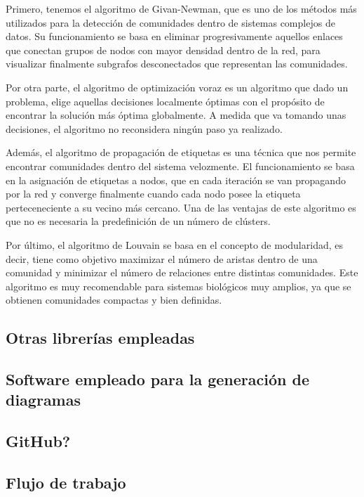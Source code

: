 Primero, tenemos el algoritmo de Givan-Newman, que es uno de los métodos más utilizados para la detección de comunidades dentro de sistemas complejos de datos. Su funcionamiento se basa en eliminar progresivamente aquellos enlaces que conectan grupos de nodos con mayor densidad dentro de la red, para visualizar finalmente subgrafos desconectados que representan las comunidades.

Por otra parte, el algoritmo de optimización voraz es un algoritmo que dado un problema, elige aquellas decisiones localmente óptimas con el propósito de encontrar la solución más óptima globalmente. A medida que va tomando unas decisiones, el algoritmo no reconsidera ningún paso ya realizado.

Además, el algoritmo de propagación de etiquetas es una técnica que nos permite encontrar comunidades dentro del sistema velozmente. El funcionamiento se basa en la asignación de etiquetas a nodos, que en cada iteración se van propagando por la red y converge finalmente cuando cada nodo posee la etiqueta perteceneciente a su vecino más cercano. Una de las ventajas de este algoritmo es que no es necesaria la predefinición de un número de clústers.

Por último, el algoritmo de Louvain se basa en el concepto de modularidad, es decir, tiene como objetivo maximizar el número de aristas dentro de una comunidad y minimizar el número de relaciones entre distintas comunidades. Este algoritmo es muy recomendable para sistemas biológicos muy amplios, ya que se obtienen comunidades compactas y bien definidas.

\subsection{Otras librerías empleadas}

\subsection{Software empleado para la generación de diagramas}

\subsection{GitHub?}

\subsection{Flujo de trabajo}

